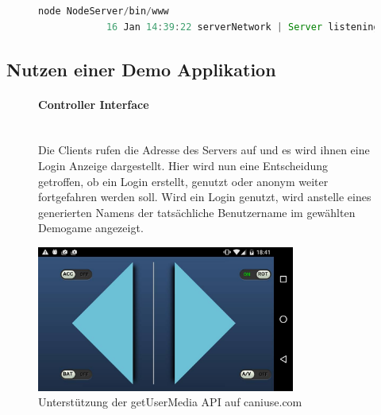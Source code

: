\documentclass[a4paper]{spie}  %
\begin{document}
\begin{figure}[h!]
	\centering
        \begin{lstlisting}[language=JavaScript,caption={Start der Applikation},label={lst:launchSuccess}]
            node NodeServer/bin/www
            16 Jan 14:39:22 serverNetwork | Server listening on port 5222
        \end{lstlisting}
\end{figure}
\subsection{Nutzen einer Demo Applikation}

\begin{figure}[H]
\begin{minipage}[t]{0.4\textwidth}
\vspace{0pt}
\paragraph{Controller Interface}\mbox{}\\
Die Clients rufen die Adresse des Servers auf und es wird ihnen eine Login Anzeige dargestellt. Hier wird nun eine Entscheidung getroffen, ob ein Login erstellt, genutzt oder anonym weiter fortgefahren werden soll.
Wird ein Login genutzt, wird anstelle eines generierten Namens der tatsächliche Benutzername im gewählten Demogame angezeigt.

\end{minipage}
\hfill
\begin{minipage}[t]{0.5\textwidth}
\vspace{0pt}
    \includegraphics[width=8.5cm]{images/controllerLayoutModern}
     \caption{Unterstützung der getUserMedia API auf caniuse.com}
		\label{fig:test2}
\end{minipage}
\end{figure}
\end{document}
